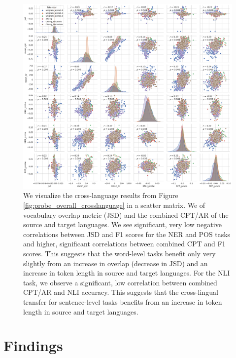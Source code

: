 \begin{figure}
    \centering
    \includegraphics[width=\textwidth]{figures/probe_detailed_crosslanguage_scattermatrix.pdf}
    \caption{We visualize the cross-language results from Figure \ref{fig:probe_overall_crosslanguage} in a scatter matrix. We  of vocabulary overlap metric (JSD) and the combined CPT/AR of the source and target languages. We see significant, very low negative correlations between JSD and F1 scores for the NER and POS tasks and higher, significant correlations between combined CPT and F1 scores. This suggests that the word-level tasks benefit only very slightly from an increase in overlap (decrease in JSD) and an increase in token length in source and target languages. For the NLI task, we observe a significant, low correlation between combined CPT/AR and NLI accuracy. This suggests that the cross-lingual transfer for sentence-level tasks benefits from an increase in token length in source and target languages.}
    \label{fig:probe_overall_crosslanguage_scattermatrix}
\end{figure}

\section{Findings}

